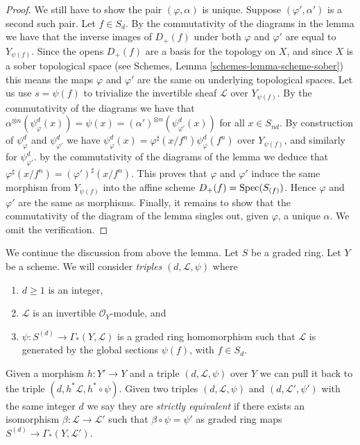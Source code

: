 \begin{proof}
\medskip\noindent
We still have to show the pair $(\varphi, \alpha)$ is unique.
Suppose $(\varphi', \alpha')$ is a second such pair.
Let $f \in S_d$. By the commutativity of the diagrams in the lemma we have
that the inverse images of $D_{+}(f)$ under both $\varphi$ and $\varphi'$
are equal to $Y_{\psi(f)}$. Since the opens $D_{+}(f)$ are a basis
for the topology on $X$, and since $X$ is a sober topological
space (see Schemes, Lemma \ref{schemes-lemma-scheme-sober})
this means the maps $\varphi$ and $\varphi'$ are the same
on underlying topological spaces. Let us use $s = \psi(f)$ to
trivialize the invertible sheaf $\mathcal{L}$ over $Y_{\psi(f)}$.
By the commutativity of the diagrams we have that
$\alpha^{\otimes n}(\psi^d_{\varphi}(x)) =
\psi(x) = (\alpha')^{\otimes n}(\psi^d_{\varphi'}(x))$
for all $x \in S_{nd}$. By construction of $\psi^d_{\varphi}$
and $\psi^d_{\varphi'}$ we have
$\psi^d_{\varphi}(x) = \varphi^\sharp(x/f^n) \psi^d_{\varphi}(f^n)$
over $Y_{\psi(f)}$,
and similarly for $\psi^d_{\varphi'}$. by the commutativity of
the diagrams of the lemma we deduce that
$\varphi^\sharp(x/f^n) = (\varphi')^\sharp(x/f^n)$.
This proves that $\varphi$ and $\varphi'$ induce the same morphism
from $Y_{\psi(f)}$ into the affine scheme $D_{+}(f) = \mathop{\rm Spec}(S_{(f)})$.
Hence $\varphi$ and $\varphi'$ are the same as morphisms.
Finally, it remains to show that the commutativity of the
diagram of the lemma singles out, given $\varphi$, a unique
$\alpha$. We omit the verification.
\end{proof}

\noindent
We continue the discussion from above the lemma.
Let $S$ be a graded ring.
Let $Y$ be a scheme. We will consider {\it triples}
$(d, \mathcal{L}, \psi)$ where
\begin{enumerate}
\item $d \geq 1$ is an integer,
\item $\mathcal{L}$ is an invertible $\mathcal{O}_Y$-module, and
\item $\psi : S^{(d)} \to \Gamma_*(Y, \mathcal{L})$ is a graded
ring homomorphism such that $\mathcal{L}$ is generated by
the global sections $\psi(f)$, with $f \in S_d$.
\end{enumerate}
Given a morphism $h : Y' \to Y$ and a triple
$(d, \mathcal{L}, \psi)$ over $Y$ we can pull it back to the
triple $(d, h^*\mathcal{L}, h^* \circ \psi)$.
Given two triples $(d, \mathcal{L}, \psi)$ and
$(d, \mathcal{L}', \psi')$ with the same integer $d$
we say they are {\it strictly equivalent} if there exists
an isomorphism $\beta : \mathcal{L} \to \mathcal{L}'$
such that $\beta \circ \psi = \psi'$ as graded
ring maps $S^{(d)} \to \Gamma_*(Y, \mathcal{L}')$.

